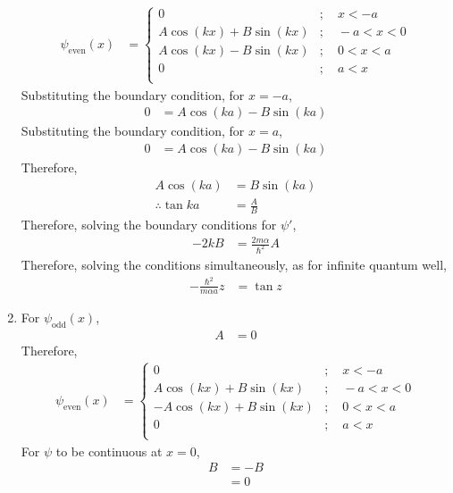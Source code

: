 \documentclass[fleqn, a4paper, 11pt, oneside]{amsart}
\theoremstyle{definition}
\theoremstyle{theorem}
\begin{document}
\begin{solution}
\begin{enumerate}
\begin{align*}
				\psi_{\text{even}}(x) &=
					\begin{cases}
						0 &;\quad x < -a\\
						A \cos(k x) + B \sin(k x) &;\quad -a < x < 0\\
						A \cos(k x) - B \sin(k x) &;\quad 0 < x < a\\
						0 &;\quad a < x\\
					\end{cases}
			\end{align*}
			Substituting the boundary condition, for $x = -a$,
			\begin{align*}
				0 &= A \cos(k a) - B \sin(k a)
			\end{align*}
			Substituting the boundary condition, for $x = a$,
			\begin{align*}
				0 &= A \cos(k a) - B \sin(k a)
			\end{align*}
			Therefore,
			\begin{align*}
				A \cos(k a) &= B \sin(k a)\\
				\therefore \tan k a &= \frac{A}{B}
			\end{align*}
			Therefore, solving the boundary conditions for $\psi'$,
			\begin{align*}
				-2 k B &= \frac{2 m \alpha}{\hbar^2} A
			\end{align*}
			Therefore, solving the conditions simultaneously, as for infinite quantum well,
			\begin{align*}
				-\frac{\hbar^2}{m \alpha a} z &= \tan z
			\end{align*}
		\item
			For $\psi_{\text{odd}}(x)$,
			\begin{align*}
				A &= 0
			\end{align*}
			Therefore,
			\begin{align*}
				\psi_{\text{even}}(x) &=
					\begin{cases}
						0 &;\quad x < -a\\
						A \cos(k x) + B \sin(k x) &;\quad -a < x < 0\\
						-A \cos(k x) + B \sin(k x) &;\quad 0 < x < a\\
						0 &;\quad a < x\\
					\end{cases}
			\end{align*}
			For $\psi$ to be continuous at $x = 0$,
			\begin{align*}
				B &= -B\\
				&= 0
			\end{align*}

\end{enumerate}
\end{solution}
\end{document}
